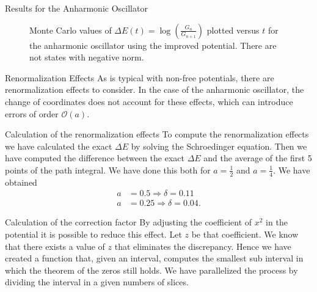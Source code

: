 \documentclass{beamer}
\begin{document}
\begin{frame}{Results for the Anharmonic Oscillator}
\begin{figure}[ht]
\begin{minipage}[b]{0.4\linewidth}
            \caption{Monte Carlo values of $ \Delta E(t)= \log\left( \frac{G_n}{G_{n+1}} \right)$ plotted versus $t$ for the anharmonic oscillator using the improved potential. There are not states with negative norm.}
            \label{fig:anharmonic_oscillator_with_no_ghosts}
        \end{minipage}
    \end{figure}
\end{frame}

\begin{frame}{Renormalization Effects}
    As is typical with non-free potentials, there are renormalization effects to consider. In the case of the anharmonic oscillator, the change of coordinates does not account for these effects, which can introduce errors of order $\mathcal{O}(a)$.
\end{frame}

\begin{frame}{Calculation of the renormalization effects}
    To compute the renormalization effects we have calculated the exact $\Delta E$  by solving the Schroedinger equation. Then we have computed the difference between the exact $\Delta E$  and the average of the first 5 points of the path integral. We have done this both for $a=\frac{1}{2}$ and $a= \frac{1}{4}$.
    We have obtained
    \begin{align*}
        a &= 0.5 \Rightarrow \delta = 0.11 \\
        a &= 0.25 \Rightarrow \delta = 0.04.
    \end{align*}
\end{frame}

\begin{frame}{Calculation of the correction factor}
    By adjusting the coefficient of $x^2$ in the potential it is possible to reduce this effect. Let $z$ be that coefficient.
    We know that there exists a value of $z$ that eliminates the discrepancy.
    Hence we have created a function that, given an interval, computes the smallest sub interval in which the theorem of the zeros still holds. We have parallelized the process by dividing the interval in a given numbers of slices.
\end{frame}
\end{document}
